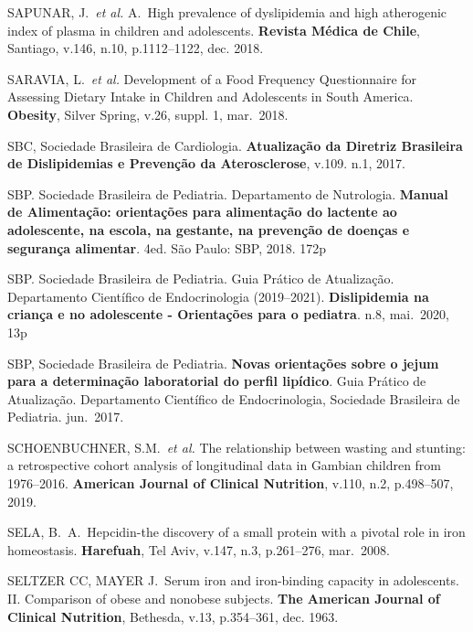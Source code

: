 \noindent SAPUNAR, J.\ \textit{et al.} A.\ High prevalence of dyslipidemia and high atherogenic index of plasma in children and adolescents. \textbf{Revista Médica de Chile}, Santiago, v.146, n.10, p.1112--1122, dec. 2018.

\bigbreak

\noindent SARAVIA, L.\ \textit{et al.} Development of a Food Frequency Questionnaire for Assessing Dietary Intake in Children and Adolescents in South America. \textbf{Obesity}, Silver Spring, v.26, suppl. 1, mar.\ 2018.

\bigbreak

\noindent SBC, Sociedade Brasileira de Cardiologia.  \textbf{Atualização da Diretriz Brasileira de Dislipidemias e Prevenção da Aterosclerose}, v.109. n.1, 2017.

\bigbreak

\noindent SBP. Sociedade Brasileira de Pediatria. Departamento de Nutrologia. \textbf{Manual de Alimentação: orientações para alimentação do lactente ao adolescente, na escola, na gestante, na prevenção de doenças e segurança alimentar}. 4ed. São Paulo: SBP, 2018. 172p

\bigbreak

\noindent SBP. Sociedade Brasileira de Pediatria. Guia Prático de Atualização. Departamento Científico de Endocrinologia (2019--2021). \textbf{Dislipidemia na criança e no adolescente - Orientações para o pediatra}. n.8, mai.\ 2020, 13p

\bigbreak

\noindent SBP, Sociedade Brasileira de Pediatria. \textbf{Novas orientações sobre o jejum para a determinação laboratorial do perfil lipídico}. Guia Prático de Atualização. Departamento Científico de Endocrinologia, Sociedade Brasileira de Pediatria. jun.\ 2017.

\bigbreak

\noindent SCHOENBUCHNER, S.M.\ \textit{et al.} The relationship between wasting and stunting: a retrospective cohort analysis of longitudinal data in Gambian children from 1976–2016. \textbf{American Journal of Clinical Nutrition}, v.110, n.2, p.498–507, 2019.

\bigbreak

\noindent SELA, B.\ A.\ Hepcidin-the discovery of a small protein with a pivotal role in iron homeostasis. \textbf{Harefuah}, Tel Aviv, v.147, n.3, p.261--276, mar.\ 2008.

\bigbreak

\noindent SELTZER CC, MAYER J.\ Serum iron and iron-binding capacity in adolescents. II. Comparison of obese and nonobese subjects. \textbf{The American Journal of Clinical Nutrition}, Bethesda, v.13, p.354–361, dec. 1963. 

